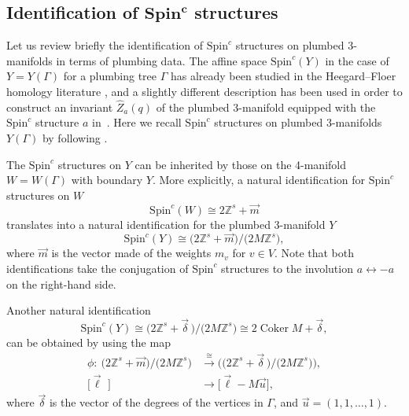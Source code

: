 \subsection[Identification of Spin\^{}c structures]{Identification of $\boldsymbol{\text{Spin}^c}$ structures}

Let us review briefly the identification of $ \text{Spin}^c $ structures on plumbed 3-manifolds in terms of plumbing data. The affine space $ \text{Spin}^c(Y) $ in the case of $ Y=Y(\Gamma) $ for a plumbing tree $ \Gamma $ has already been studied in the Heegard--Floer homology literature \cite{heegard-floer}, and a slightly different description has been used in order to construct an invariant $ \hat{Z}_a(q) $ of the plumbed 3-manifold equipped with the $\text{Spin}^c$ structure $ a $ in~\cite{gukov}. Here we recall $ \text{Spin}^c $ structures on plumbed 3-mani\-folds $ Y(\Gamma) $ by following \cite{gukov}.

The $ \text{Spin}^c $ structures on $ Y $ can be inherited by those on the 4-manifold $ W=W(\Gamma) $ with boundary $ Y $. More explicitly, a natural identification for $ \text{Spin}^c $ structures on $ W $
\begin{equation*}
	\text{Spin}^c(W)\cong 2\mathbb{Z}^s+\vec{m}
\end{equation*}
translates into a natural identification for the plumbed 3-manifold $ Y $
\begin{equation*}
	\text{Spin}^c(Y)\cong \big(2\mathbb{Z}^s+\vec{m}\big)/\big(2M\mathbb{Z}^s\big),
\end{equation*}
where $ \vec{m} $ is the vector made of the weights $ m_v $ for $ v\in V $. Note that both identifications take the conjugation of $ \text{Spin}^c $ structures to the involution $ a\leftrightarrow -a $ on the right-hand side.

Another natural identification
\begin{equation}\label{eqn_spinc_identification_Y}
	\text{Spin}^c(Y)\cong \big(2\mathbb{Z}^s+\vec{\delta}\,\big)/\big(2M\mathbb{Z}^s\big) \cong 2\operatorname{Coker}M+\vec{\delta},
\end{equation}
can be obtained by using the map
\[
\begin{split}
	\phi\colon \ \big(2\mathbb{Z}^s+\vec{m}\big)/\big(2M\mathbb{Z}^s\big) & \xrightarrow{\cong} \big(\big(2\mathbb{Z}^s+\vec{\delta}\,\big)/\big(2M\mathbb{Z}^s\big)\big),\\
	\big[\vec{\ell}\,\,\big] & \rightarrow \big[\vec{\ell}-M\vec{u}\big],
\end{split}
\]
where $ \vec{\delta} $ is the vector of the degrees of the vertices in $ \Gamma $, and $ \vec{u}=(1,1,\dots,1) $.

